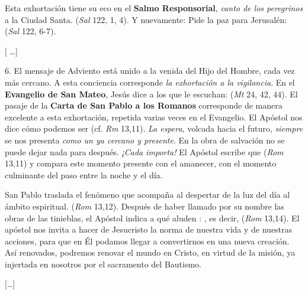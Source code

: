 \begin{body}
	Esta exhortación tiene su eco en el \textbf{Salmo Responsorial}, \emph{canto de los peregrinos} a la Ciudad Santa.  (\emph{Sal} 122, 1, 4). Y nuevamente: Pide la paz para Jerusalén:  (\emph{Sal} 122, 6-7). 
	
	{[} \ldots{}{]} 
	
	6. El mensaje de Adviento está unido a la venida del Hijo del Hombre, cada vez más cercano. A esta conciencia corresponde \emph{la exhortación a la vigilancia}. En el \textbf{Evangelio de San Mateo}, Jesús dice a los que le escuchan:  (\emph{Mt} 24, 42, 44). El pasaje de la \textbf{Carta de San Pablo a los Romanos} corresponde de manera excelente a esta exhortación, repetida varias veces en el Evangelio. El Apóstol nos dice cómo podemos ser  (cf. \emph{Rm} 13,11). \emph{La espera}, volcada hacia el futuro, \emph{siempre} se nos presenta \emph{como un  ya cercano y presente}. En la obra de salvación no se puede dejar nada para después. \emph{¡Cada  importa!} El Apóstol escribe que  (\emph{Rom} 13,11) y compara este momento presente con el amanecer, con el momento culminante del paso entre la noche y el día. 
	
	San Pablo traslada el fenómeno que acompaña al despertar de la luz del día al ámbito espiritual.  (\emph{Rom} 13,12). Después de haber llamado por su nombre las obras de las tinieblas, el Apóstol indica a qué aluden : , es decir,  (\emph{Rom} 13,14). El apóstol nos invita a hacer de Jesucristo la norma de nuestra vida y de nuestras acciones, para que en Él podamos llegar a convertirnos en una nueva creación. Así renovados, podremos renovar el mundo en Cristo, en virtud de la misión, ya injertada en nosotros por el sacramento del Bautismo. 
	
	{[}\ldots{}{]}
\end{body}

